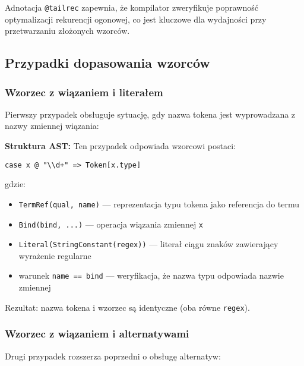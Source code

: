 Adnotacja \texttt{@tailrec} zapewnia, że kompilator zweryfikuje poprawność optymalizacji rekurencji ogonowej, co jest kluczowe dla wydajności przy przetwarzaniu złożonych wzorców.

\subsection{Przypadki dopasowania wzorców}
\label{subsec:cnp-cases}

\subsubsection{Wzorzec z wiązaniem i literałem}
\label{subsubsec:cnp-bind-literal}

Pierwszy przypadek obsługuje sytuację, gdy nazwa tokena jest wyprowadzana z nazwy zmiennej wiązania:




\textbf{Struktura AST:} Ten przypadek odpowiada wzorcowi postaci:
\begin{lstlisting}
case x @ "\\d+" => Token[x.type]
\end{lstlisting}

gdzie:
\begin{itemize}
    \item \texttt{TermRef(qual, name)} --- reprezentacja typu tokena jako referencja do termu
    \item \texttt{Bind(bind, ...)} --- operacja wiązania zmiennej \texttt{x}
    \item \texttt{Literal(StringConstant(regex))} --- literał ciągu znaków zawierający wyrażenie regularne
    \item warunek \texttt{name == bind} --- weryfikacja, że nazwa typu odpowiada nazwie zmiennej
\end{itemize}

Rezultat: nazwa tokena i wzorzec są identyczne (oba równe \texttt{regex}).

\subsubsection{Wzorzec z wiązaniem i alternatywami}
\label{subsubsec:cnp-bind-alternatives}

Drugi przypadek rozszerza poprzedni o obsługę alternatyw:

